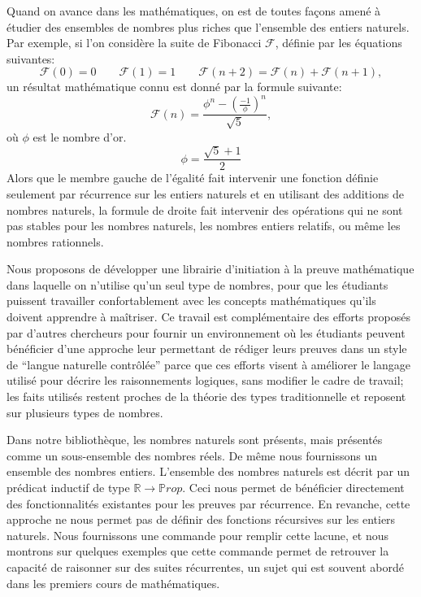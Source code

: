 \documentclass{jflart}
\begin{document}
Quand on avance dans les mathématiques, on est de toutes façons amené à
étudier des ensembles de nombres plus riches que l'ensemble des
entiers naturels.  Par exemple, si l'on considère la suite de
Fibonacci \({\mathcal F}\), définie par les équations suivantes:
\[{\mathcal F}(0) = 0 \qquad {\mathcal F}(1)= 1\qquad {\mathcal F}(n +
2) = {\mathcal F}(n) + {\mathcal F}(n + 1),\]
un résultat mathématique connu est donné par la formule suivante:
\[{\mathcal F} (n) = \frac{\phi ^n - ({\frac{-1}{\phi}}) ^
  n}{\sqrt{5}},\]
où \(\phi\) est le nombre d'or.
\[\phi = \frac{\sqrt{5} + 1}{2}\]
Alors que le membre gauche de l'égalité fait intervenir une fonction définie
seulement par récurrence sur les entiers naturels et en utilisant des
additions de nombres naturels, la formule de droite fait intervenir des
opérations qui ne sont pas stables pour les nombres naturels, les nombres
entiers relatifs, ou même les nombres rationnels.

Nous proposons de développer une librairie d'initiation à la preuve 
mathématique dans laquelle on n'utilise qu'un seul type de nombres,
pour que les étudiants puissent travailler confortablement avec les
concepts mathématiques qu'ils doivent apprendre à maîtriser.  Ce
travail est complémentaire des efforts proposés par d'autres
chercheurs pour fournir un environnement où les étudiants peuvent
bénéficier d'une approche leur permettant de rédiger leurs preuves
dans un style de ``langue naturelle contrôlée'' parce que ces efforts
visent à améliorer le langage utilisé pour décrire les raisonnements
logiques, sans modifier le cadre de travail; les faits utilisés
restent proches de la théorie des types traditionnelle et reposent sur
plusieurs types de nombres.

Dans notre bibliothèque, les nombres naturels sont présents, mais
présentés comme un sous-ensemble des nombres réels.  De même nous
fournissons un ensemble des nombres entiers.  L'ensemble des
nombres naturels est
décrit par un prédicat inductif de type \({\mathbb R} \rightarrow
{\mathbb Prop}\).  Ceci nous permet de bénéficier directement des
fonctionnalités existantes pour les preuves par récurrence.  En
revanche, cette approche ne nous permet pas de définir des fonctions
récursives sur les entiers naturels.  Nous fournissons une commande
pour remplir cette lacune, et nous montrons sur quelques exemples que
cette commande permet de retrouver la capacité de raisonner sur des suites
récurrentes, un sujet qui est souvent abordé dans les premiers
cours de mathématiques.
\end{document}
